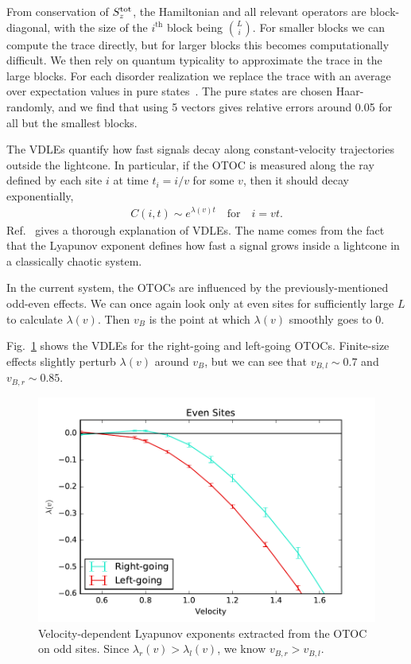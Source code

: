 \documentclass[aps,prx,reprint,superscriptaddress, longbibliography]{revtex4-1}
\newcommand{\Sz}{S_z^{\rm tot}}
\begin{document}
From conservation of $\Sz$, the Hamiltonian and all relevant operators are block-diagonal, with the size of the $i^\text{th}$ block being $\binom{L}{i}$. For smaller blocks we can compute the trace directly, but for larger blocks this becomes computationally difficult. We then rely on quantum typicality to approximate the trace in the large blocks. For each disorder realization we replace the trace with an average over expectation values in pure states~\cite{Luitz2017}. The pure states are chosen Haar-randomly, and we find that using 5 vectors gives relative errors around 0.05 for all but the smallest blocks.

The VDLEs quantify how fast signals decay along constant-velocity trajectories outside the lightcone. In particular, if the OTOC is measured along the ray defined by each site $i$ at time $t_i = i/v$ for some $v$, then it should decay exponentially,
\begin{align}
	C(i, t) \sim e^{\lambda(v)t}\quad\text{for}\quad i = vt.
\end{align}
Ref.~\cite{Khemani2018lambda} gives a thorough explanation of VDLEs. The name comes from the fact that the Lyapunov exponent defines how fast a signal grows inside a lightcone in a classically chaotic system.

In the current system, the OTOCs are influenced by the previously-mentioned odd-even effects. We can once again look only at even sites for sufficiently large $L$ to calculate $\lambda(v)$. Then $v_B$ is the point at which $\lambda(v)$ smoothly goes to 0.

Fig.~\ref{fig:vdle} shows the VDLEs for the right-going and left-going OTOCs. Finite-size effects slightly perturb $\lambda(v)$ around $v_B$, but we can see that $v_{B,l} \sim 0.7$ and $v_{B,r} \sim 0.85$.

\begin{figure}
	\includegraphics[width=\columnwidth]{vdle}
	\caption{Velocity-dependent Lyapunov exponents extracted from the OTOC on odd sites. Since $\lambda_r(v)>\lambda_l(v)$, we know $v_{B,r}>v_{B,l}$.}
	\label{fig:vdle}
\end{figure}
\end{document}
